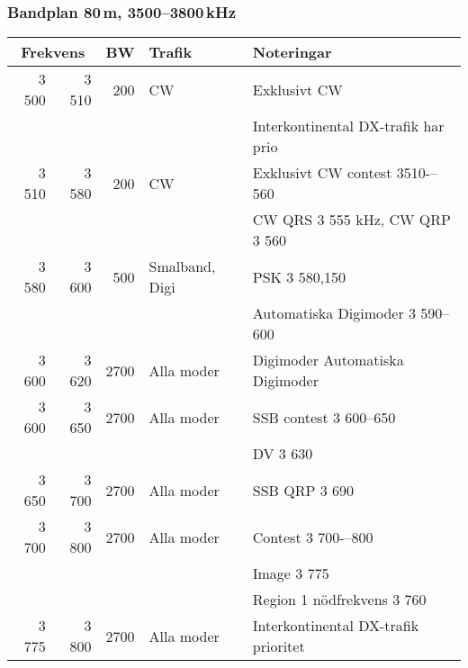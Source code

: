 \begin{landscape}
\subsubsection{Bandplan 80\,m, 3500--3800\,kHz}
\begin{tabular}{rrrll}
\multicolumn{2}{c}{\textbf{Frekvens}} & \textbf{BW} & \textbf{Trafik} & \textbf{Noteringar} \\ \hline
3 500 & 3 510 & 200  & CW             & Exklusivt CW                         \\ 
      &       &      &                & Interkontinental DX-trafik har prio  \\ \hline
3 510 & 3 580 & 200  & CW             & Exklusivt CW contest 3510-–560       \\ 
      &       &      &                & CW QRS 3 555 kHz, CW QRP 3 560       \\ \hline
3 580 & 3 600 & 500  & Smalband, Digi & PSK 3 580,150                        \\
      &       &      &                & Automatiska Digimoder 3 590--600     \\ \hline
3 600 & 3 620 & 2700 & Alla moder     & Digimoder Automatiska Digimoder      \\ \hline
3 600 & 3 650 & 2700 & Alla moder     & SSB contest 3 600--650               \\
      &       &      &                & DV 3 630                             \\ \hline
3 650 & 3 700 & 2700 & Alla moder     & SSB QRP 3 690                        \\ \hline
3 700 & 3 800 & 2700 & Alla moder     & Contest 3 700-–800                   \\
      &       &      &                & Image 3 775                          \\
      &       &      &                & Region 1 nödfrekvens 3 760           \\ \hline
3 775 & 3 800 & 2700 & Alla moder     & Interkontinental DX-trafik prioritet \\ \hline
\end{tabular}


\end{landscape}

